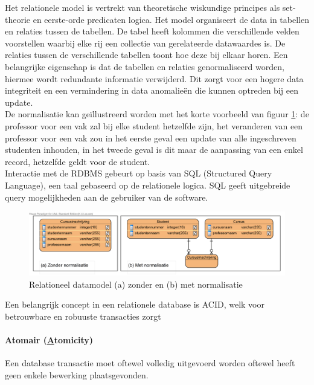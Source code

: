 Het relationele model is vertrekt van theoretische wiskundige principes als set-theorie en eerste-orde predicaten logica. Het model organiseert de data in tabellen en relaties tussen de tabellen. De tabel heeft kolommen die verschillende velden voorstellen waarbij elke rij een collectie van gerelateerde datawaardes is. De relaties tussen de verschillende tabellen toont hoe deze bij elkaar horen. Een belangrijke eigenschap is dat de tabellen en relaties genormaliseerd worden, hiermee wordt redundante informatie verwijderd. Dit zorgt voor een hogere data integriteit en een vermindering in data anomalieën die kunnen optreden bij een update.\cite{Elmasri:2010:FDS:1855347} \\
De normalisatie kan geïllustreerd worden met het korte voorbeeld van figuur \ref{fig:Relationeel-Model-Normalisatie}: de professor voor een vak zal bij elke student hetzelfde zijn, het veranderen van een professor voor een vak zou in het eerste geval een update van alle ingeschreven studenten inhouden, in het tweede geval is dit maar de aanpassing van een enkel record, hetzelfde geldt voor de student. \\
Interactie met de RDBMS gebeurt op basis van SQL (Structured Query Language), een taal gebaseerd op de relationele logica. SQL geeft uitgebreide query mogelijkheden aan de gebruiker van de software.   
\begin{figure}[ht!]
\centering
\includegraphics[width=\linewidth]{img/Relationeel-Model-Normalisatie.png}
\caption[Relationeel datamodel (a) zonder en (b) met normalisatie]{Relationeel datamodel (a) zonder en (b) met normalisatie}
\label{fig:Relationeel-Model-Normalisatie}
\end{figure}

Een belangrijk concept in een relationele database is ACID, welk voor betrouwbare en robuuste transacties zorgt

\paragraph{Atomair (\underline{A}tomicity)} Een database transactie moet oftewel volledig uitgevoerd worden oftewel heeft geen enkele bewerking plaatsgevonden. 

